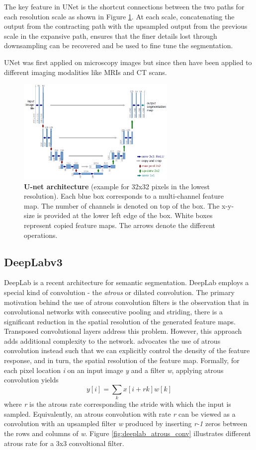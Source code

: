 \documentclass[10pt, journal, compsoc]{IEEEtran}
\begin{document}
The key feature in UNet is the shortcut connections between the two paths for each resolution scale as shown in Figure \ref{fig:unet}. At each scale, concatenating the output from the contracting path with the upsampled output from the previous scale in the expansive path, ensures that the finer details lost through downsampling can be recovered and be used to fine tune the segmentation.

UNet was first applied on microscopy images but since then have been applied to different imaging modalities like MRIs and CT scans.
\begin{figure}
\centering
\includegraphics[width=3in]{unet.png}
\caption{\textbf{U-net architecture} \cite{RFB15a} (example for 32x32 pixels in the lowest resolution). Each blue
box corresponds to a multi-channel feature map. The number of channels is denoted
on top of the box. The x-y-size is provided at the lower left edge of the box. White
boxes represent copied feature maps. The arrows denote the different operations.}
\label{fig:unet}
\end{figure}
\subsection{DeepLabv3}
DeepLab\cite{DBLP:journals/corr/ChenPSA17} is a recent architecture for semantic segmentation. DeepLab employs a special kind of convolution - the \textit{atrous} or dilated convolution. The primary motivation behind the use of atrous convolution filters is the observation that in convolutional networks with consecutive pooling and striding, there is a significant reduction in the spatial resolution of the generated feature maps. Transposed convolutional layers address this problem. However, this approach adds additional complexity to the network. \cite{DBLP:journals/corr/ChenPSA17} advocates the use of atrous convolution instead such that we can explicitly control the density of the feature response, and in turn, the spatial resolution of the feature map. Formally, for each pixel location \textit{i} on an input image \textit{y} and a filter \textit{w}, applying atrous convolution yields
\begin{equation}
y[i] = \sum_k x[i+rk]w[k]
\end{equation}
where \textit{r} is the atrous rate corresponding the stride with which the input is sampled. Equivalently, an atrous convolution with rate \textit{r} can be viewed as a convolution with an upsampled filter \textit{w} produced by inserting \textit{r-1} zeros between the rows and columns of \textit{w}. Figure \ref{fig:deeplab_atrous_conv} illustrates different atrous rate for a 3x3 convoltional filter.
\end{document}

